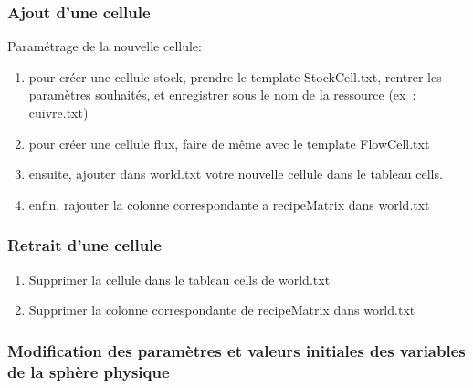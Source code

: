 \documentclass[12pt,a4paper]{article}%
\begin{document}
\subsubsection{Ajout d'une cellule}

Paramétrage de la nouvelle cellule:

\begin{enumerate}
\item pour créer une cellule stock, prendre le template StockCell.txt, rentrer
les paramètres souhaités, et enregistrer sous le nom de la ressource (ex~: cuivre.txt)

\item pour créer une cellule flux, faire de même avec le template FlowCell.txt

\item ensuite, ajouter dans world.txt votre nouvelle cellule dans le tableau cells.

\item enfin, rajouter la colonne correspondante a recipeMatrix dans world.txt
\end{enumerate}

\subsubsection{Retrait d'une cellule}

\begin{enumerate}
\item Supprimer la cellule dans le tableau cells de world.txt

\item Supprimer la colonne correspondante de recipeMatrix dans world.txt
\end{enumerate}

\subsubsection{Modification des paramètres et valeurs initiales des
variables de la sphère physique}
\end{document}
